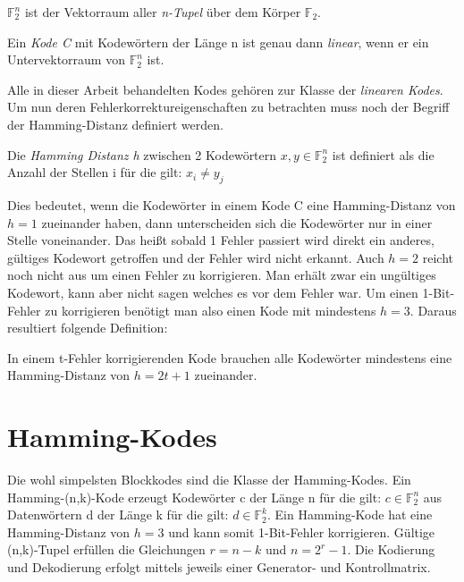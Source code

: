 \begin{t_def}
$\mathbb{F}_{2}^{n}$ ist der Vektorraum aller {\em n-Tupel} über dem Körper $\mathbb{F}_2$.
\end{t_def}

\begin{t_def}
Ein {\em Kode C} mit Kodewörtern der Länge n ist genau dann {\em linear}, wenn er ein Untervektorraum von $\mathbb{F}_{2}^{n}$ ist.
\end{t_def}

Alle in dieser Arbeit behandelten Kodes gehören zur Klasse der \textit{linearen Kodes}.\cite[Kap. 1.2]{huffman2010fundamentals} Um nun deren Fehlerkorrektureigenschaften zu betrachten muss noch der Begriff der Hamming-Distanz definiert werden.

\begin{t_def}
Die {\em Hamming Distanz h} zwischen 2 Kodewörtern $x,y \in \mathbb{F}_{2}^{n}$ ist definiert als die Anzahl der Stellen i für die gilt: $x_i \neq y_j$
\end{t_def}

Dies bedeutet, wenn die Kodewörter in einem Kode C eine Hamming-Distanz von $h=1$ zueinander haben, dann unterscheiden sich die Kodewörter nur in einer Stelle voneinander. Das heißt sobald 1 Fehler passiert wird direkt ein anderes, gültiges Kodewort getroffen und der Fehler wird nicht erkannt. Auch $h=2$ reicht noch nicht aus um einen Fehler zu korrigieren. Man erhält zwar ein ungültiges Kodewort, kann aber nicht sagen welches es vor dem Fehler war. Um einen 1-Bit-Fehler zu korrigieren benötigt man also einen Kode mit mindestens $h=3$.\cite[Kap. 1.4]{huffman2010fundamentals} Daraus resultiert folgende Definition:

\begin{t_def}
In einem t-Fehler korrigierenden Kode brauchen alle Kodewörter mindestens eine Hamming-Distanz von $h=2t+1$ zueinander.
\end{t_def}


\section{Hamming-Kodes}
\label{section:hamming}

Die wohl simpelsten Blockkodes sind die Klasse der Hamming-Kodes. Ein Hamming-(n,k)-Kode erzeugt Kodewörter c der Länge n für die gilt: $c \in \mathbb{F}_{2}^{n}$ aus Datenwörtern d der Länge k für die gilt: $d \in \mathbb{F}_{2}^{k}$. Ein Hamming-Kode hat eine Hamming-Distanz von $h=3$ und kann somit 1-Bit-Fehler korrigieren. Gültige (n,k)-Tupel erfüllen die Gleichungen $r = n - k$ und $n = 2^r - 1$.\cite[Kap. 1.8]{huffman2010fundamentals} Die Kodierung und Dekodierung erfolgt mittels jeweils einer Generator- und Kontrollmatrix.

